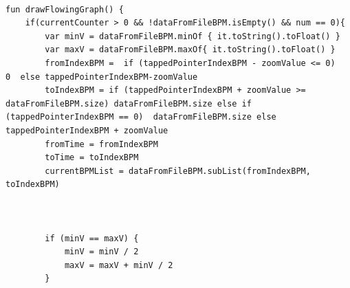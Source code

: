 {{	\mbox{}\\
	\mbox{}\\
	\mbox{}\\
	\mbox{}\\
	\mbox{}\\
	\mbox{}\\
	\mbox{}\\
	\mbox{}\\
	\mbox{}\\
	\mbox{}\\
	\mbox{}\\
	\mbox{}\\
	\mbox{}\\
	\mbox{}\\
	\mbox{}\\
	\mbox{}\\
	\mbox{}\\
	\mbox{}\\
	\mbox{}\\
	\mbox{}\\
	\mbox{}\\
	\mbox{}\\
	\mbox{}\\
	\mbox{}\\
	\mbox{}\\
	\mbox{}\\
	\mbox{}\\
	\mbox{}\\
	\mbox{}\\
	\mbox{}\\
	\mbox{}\\
	\mbox{}\\
	\mbox{}\\
	\begin{lstlisting}[label={fig:simpleSourceGen.cs}, caption={Code to draw the recorded BPM-Data}]
fun drawFlowingGraph() {
	if(currentCounter > 0 && !dataFromFileBPM.isEmpty() && num == 0){
		var minV = dataFromFileBPM.minOf { it.toString().toFloat() }
		var maxV = dataFromFileBPM.maxOf{ it.toString().toFloat() }
		fromIndexBPM =  if (tappedPointerIndexBPM - zoomValue <= 0)   0  else tappedPointerIndexBPM-zoomValue
		toIndexBPM = if (tappedPointerIndexBPM + zoomValue >= dataFromFileBPM.size) dataFromFileBPM.size else if (tappedPointerIndexBPM == 0)  dataFromFileBPM.size else tappedPointerIndexBPM + zoomValue
		fromTime = fromIndexBPM
		toTime = toIndexBPM
		currentBPMList = dataFromFileBPM.subList(fromIndexBPM, toIndexBPM)
		
		
		
		if (minV == maxV) {
			minV = minV / 2
			maxV = maxV + minV / 2
		}
	

\end{lstlisting}}}
